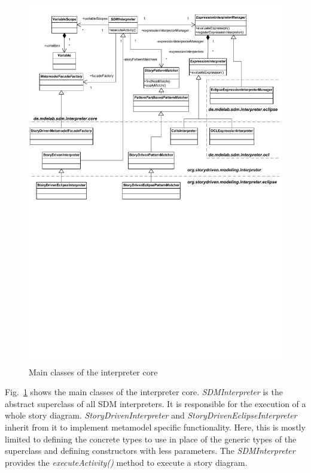 \begin{figure}[htb]
  \centering
  \includegraphics[width=1.0\columnwidth]{./figures/interpreter_core.pdf}
  \caption{Main classes of the interpreter core}
  \label{fig:sdm_interpreter}
\end{figure}

Fig.~\ref{fig:sdm_interpreter} shows the main classes of the interpreter core. \emph{SDMInterpreter} is the abstract superclass of all SDM interpreters. It is responsible for the execution of a whole story diagram. \emph{StoryDrivenInterpreter} and \emph{StoryDrivenEclipseInterpreter} inherit from it to implement metamodel specific functionality. Here, this is mostly limited to defining the concrete types to use in place of the generic types of the superclass and defining constructors with less parameters. The \emph{SDMInterpreter} provides the \emph{executeActivity()} method to execute a story diagram.

